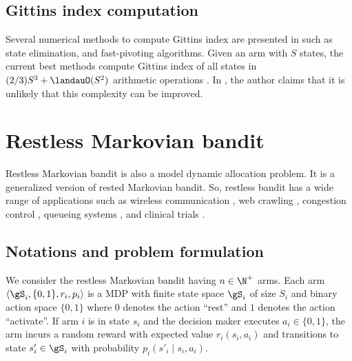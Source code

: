 
\subsection{Gittins index computation}

Several numerical methods to compute Gittins index are presented in \cite{chakravorty2014multi} such as state elimination, and fast-pivoting algorithms.
Given an arm with $S$ states, the current best methods compute Gittins index of all states in $(2/3)S^3+\landauO(S^2)$ arithmetic operations \cite{chakravorty2014multi}.
In \cite[Page~4]{nino2020fast}, the author claims that it is unlikely that this complexity can be improved.

\section{Restless Markovian bandit}
\label{sec:restless_mab_pb}

Restless Markovian bandit is also a model dynamic allocation problem.
It is a generalized version of rested Markovian bandit.
So, restless bandit has a wide range of applications such as wireless communication \cite{aalto2019whittle, liu2010indexability}, web crawling \cite{avrachenkov2022whittle, nino2014dynamic}, congestion control \cite{avrachenkov2013congestion, avrachenkov2018impulsive}, queueing systems \cite{scully2018soap, aalto2011properties,aalto2009gittins,borkar2017whittle}, and clinical trials \cite{villar2015multi}.


\subsection{Notations and problem formulation}
\label{ssec:restless_formul}

We consider the restless Markovian bandit having $n\in\N^+$ arms.
Each arm $\langle\gS_i, \{0,1\}, r_i, p_i\rangle$ is a MDP with finite state space $\gS_i$ of size $S_i$ and binary action space $\{0,1\}$ where $0$ denotes the action ``rest'' and $1$ denotes the action ``activate''.
If arm $i$ is in state $s_i$ and the decision maker executes $a_i\in\{0,1\}$, the arm incurs a random reward with expected value $r_i(s_i,a_i)$ and transitions to state $s'_i\in\gS_i$ with probability $p_i(s'_i\mid s_i,a_i)$.

